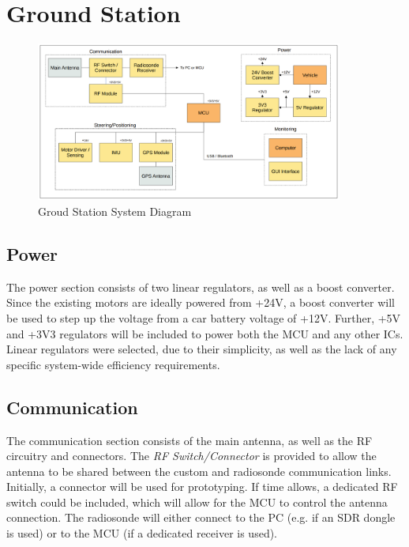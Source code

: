\graphicspath{{./figures}}

\section{Ground Station}

\begin{figure}[!htb]
  \centering
  \includegraphics[width=0.9\textwidth]{gs_system}
  \caption{Groud Station System Diagram}
  \label{fig:gs_system}
\end{figure}

\subsection{Power}
The power section consists of two linear regulators, as well as a boost converter. Since the existing motors are ideally powered from +24V, a boost converter will be used to step up the voltage from a car battery voltage of +12V. Further, +5V and +3V3 regulators will be included to power both the MCU and any other ICs. Linear regulators were selected, due to their simplicity, as well as the lack of any specific system-wide efficiency requirements.

\subsection{Communication}
The communication section consists of the main antenna, as well as the RF circuitry and connectors. The \textit{RF Switch/Connector} is provided to allow the antenna to be shared between the custom and radiosonde communication links. Initially, a connector will be used for prototyping. If time allows, a dedicated RF switch could be included, which will allow for the MCU to control the antenna connection. The radiosonde will either connect to the PC (e.g. if an SDR dongle is used) or to the MCU (if a dedicated receiver is used).

